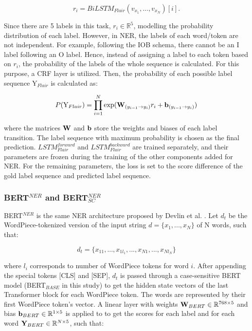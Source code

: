 \documentclass{report}
\theoremstyle{definition}
\theoremstyle{remark}
\begin{document}
\begin{equation}
    r_i = BiLSTM_{Flair}(v_{x_1},...,v_{x_N})[i].
\end{equation}

Since there are 5 labels in this task, $r_i \in \mathbb{R}^5$, modelling the probability distribution of each label. However, in NER, the labels of each word/token are not independent. For example, following the IOB schema, there cannot be an I label following an O label. Hence, instead of assigning a label to each token based on $r_i$, the probability of the labels of the whole sequence is calculated. For this purpose, a CRF layer is utilized. Then, the probability of each possible label sequence $\text{Y}_{Flair}$ is calculated as:

\begin{equation}
    P(\text{Y}_{Flair}) = \prod_{i=1}^N \text{exp}( \bold{W}_{(y_{i-1} \rightarrow y_i)}r_i + \bold{b}_{(y_{i-1} \rightarrow y_i)})
\end{equation}

\noindent where the matrices $\bold{W}$ and $\bold{b}$ store the weights and biases of each label transition. The label sequence with maximum probability is chosen as the final prediction. $LSTM^{forward}_{Flair}$ and $LSTM^{backward}_{Flair}$ are trained separately, and their parameters are frozen during the training of the other components added for NER. For the remaining parameters, the loss is set to the score difference of the gold label sequence and predicted label sequence.

\subsubsection{BERT$^{NER}$ and BERT$^{NER}_{SC}$}
BERT$^{NER}$ is the same NER architecture proposed by Devlin et al. \cite{BERT}. Let $d_t$ be the WordPiece-tokenized version of the input string $d=\{x_1,...,x_N\}$ of N words, such that:

\begin{equation}
    d_t = \{x_{11},...,x_{1l_{1}},...,x_{N1},...,x_{Nl_{N}}\}
\end{equation}

\noindent where $l_i$ corresponds to number of WordPiece tokens for word $i$. After appending the special tokens [CLS] and [SEP], $d_t$ is passed through a case-sensitive BERT model (BERT$_{BASE}$ in this study) to get the hidden state vectors of the last Transformer block for each WordPiece token. The words are represented by their first WordPiece token's vector. A linear layer with weights $\bold{W}_{BERT} \in \mathbb{R}^{768\times5}$ and bias $\bold{b}_{BERT} \in \mathbb{R}^{1\times5}$ is applied to to get the scores for each label and for each word $\bold{Y}_{BERT} \in \mathbb{R}^{N\times5}$, such that:
\end{document}
